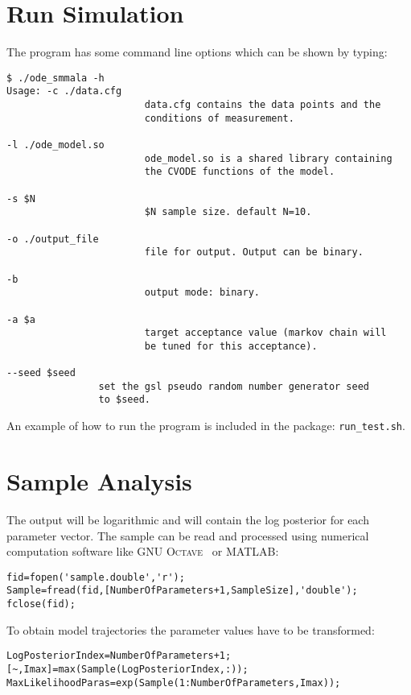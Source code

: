 \documentclass[english,12pt]{scrartcl}
\begin{document}
\section{Run Simulation}
\label{sim}

The program has some command line options which can be shown by typing:
\begin{verbatim}
$ ./ode_smmala -h
Usage: -c ./data.cfg
                        data.cfg contains the data points and the
                        conditions of measurement.

-l ./ode_model.so
                        ode_model.so is a shared library containing
                        the CVODE functions of the model.

-s $N
                        $N sample size. default N=10.

-o ./output_file
                        file for output. Output can be binary.

-b
                        output mode: binary.

-a $a
                        target acceptance value (markov chain will
                        be tuned for this acceptance).

--seed $seed
                set the gsl pseudo random number generator seed
                to $seed.
\end{verbatim}
An example of how to run the program is included in the package:
\texttt{run\_test.sh}.


\section{Sample Analysis}
\label{sec:analysis}

The output will be logarithmic and will contain the log posterior for
each parameter vector. The sample can be read and processed using
numerical computation software like \textsc{GNU Octave}~\cite{octave:2012} or MATLAB:
\begin{verbatim}
fid=fopen('sample.double','r');
Sample=fread(fid,[NumberOfParameters+1,SampleSize],'double');
fclose(fid);
\end{verbatim}
To obtain model trajectories the parameter values have to be
transformed:
\begin{verbatim}
LogPosteriorIndex=NumberOfParameters+1;
[~,Imax]=max(Sample(LogPosteriorIndex,:));
MaxLikelihoodParas=exp(Sample(1:NumberOfParameters,Imax));
\end{verbatim}

\printbibliography
\end{document}
